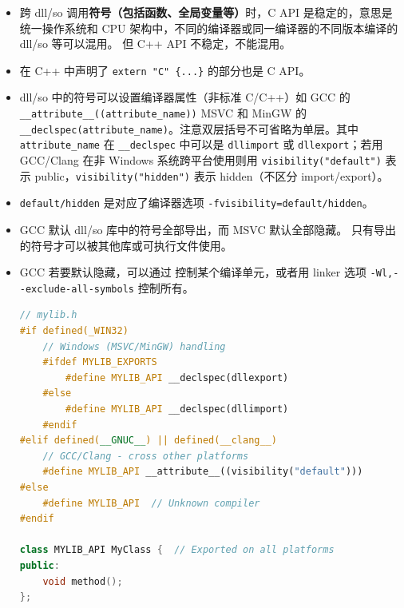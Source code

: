 

\begin{itemize}
\item 跨 dll/so 调用\textbf{符号（包括函数、全局变量等）}时，C API 是稳定的，意思是统一操作系统和 CPU 架构中，不同的编译器或同一编译器的不同版本编译的 dll/so 等可以混用。 但 C++ API 不稳定，不能混用。
\item 在 C++ 中声明了 \verb`extern "C" {...}` 的部分也是 C API。
\item dll/so 中的符号可以设置编译器属性（非标准 C/C++）如 GCC 的 \verb`__attribute__((attribute_name))` MSVC 和 MinGW 的 \verb`__declspec(attribute_name)`。注意双层括号不可省略为单层。其中 \verb`attribute_name` 在 \verb`__declspec` 中可以是 \verb`dllimport` 或 \verb`dllexport`；若用 GCC/Clang 在非 Windows 系统跨平台使用则用 \verb`visibility("default")` 表示 public，\verb`visibility("hidden")` 表示 hidden（不区分 import/export）。
\item \verb`default/hidden` 是对应了编译器选项 \verb`-fvisibility=default/hidden`。
\item GCC 默认 dll/so 库中的符号全部导出，而 MSVC 默认全部隐藏。 只有导出的符号才可以被其他库或可执行文件使用。
\item GCC 若要默认隐藏，可以通过 控制某个编译单元，或者用 linker 选项 \verb`-Wl,--exclude-all-symbols` 控制所有。
\begin{lstlisting}[language=cpp]
// mylib.h
#if defined(_WIN32)
    // Windows (MSVC/MinGW) handling
    #ifdef MYLIB_EXPORTS
        #define MYLIB_API __declspec(dllexport)
    #else
        #define MYLIB_API __declspec(dllimport)
    #endif
#elif defined(__GNUC__) || defined(__clang__)
    // GCC/Clang - cross other platforms
    #define MYLIB_API __attribute__((visibility("default")))
#else
    #define MYLIB_API  // Unknown compiler
#endif

class MYLIB_API MyClass {  // Exported on all platforms
public:
    void method();
};
\end{lstlisting}
\end{itemize}
